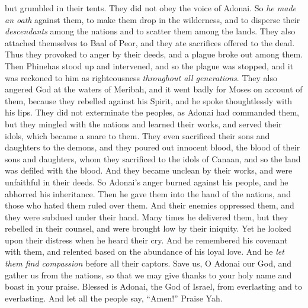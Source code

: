 \begin{biblechapter}
\verse but grumbled in their tents. 
They did not obey the voice of Adonai.
\verse So \textit{he made an oath} against them, 
to make them drop in the wilderness,
\verse and to disperse their \textit{descendants} among the nations 
and to scatter them among the lands.
\verse They also attached themselves to Baal of Peor, 
and they ate sacrifices offered to the dead.
\verse Thus they provoked to anger by their deeds, 
and a plague broke out among them.
\verse Then Phinehas stood up and intervened, 
and so the plague was stopped,
\verse and it was reckoned to him as righteousness 
\textit{throughout all generations}.
\verse They also angered God at the waters of Meribah, 
and it went badly for Moses on account of them,
\verse because they rebelled against his Spirit, 
and he spoke thoughtlessly with his lips.
\verse They did not exterminate the peoples, 
as Adonai had commanded them, 
\verse but they mingled with the nations 
and learned their works,
\verse and served their idols, 
which became a snare to them.
\verse They even sacrificed their sons and daughters 
to the demons,
\verse and they poured out innocent blood, 
the blood of their sons and daughters, 
whom they sacrificed to the idols of Canaan, 
and so the land was defiled with the blood.
\verse And they became unclean by their works, 
and were unfaithful in their deeds.
\verse So Adonai’s anger burned against his people, 
and he abhorred his inheritance.
\verse Then he gave them into the hand of the nations, 
and those who hated them ruled over them.
\verse And their enemies oppressed them, 
and they were subdued under their hand.
\verse Many times he delivered them, 
but they rebelled in their counsel, 
and were brought low by their iniquity.
\verse Yet he looked upon their distress 
when he heard their cry.
\verse And he remembered his covenant with them, 
and relented based on the abundance of his loyal love.
\verse And he \textit{let them find compassion} 
before all their captors.
\verse Save us, O Adonai our God, 
and gather us from the nations, 
so that we may give thanks to your holy name 
and boast in your praise.
\verse Blessed is Adonai, the God of Israel, 
from everlasting and to everlasting. 
And let all the people say, “Amen!” 
Praise Yah.
\end{biblechapter}

